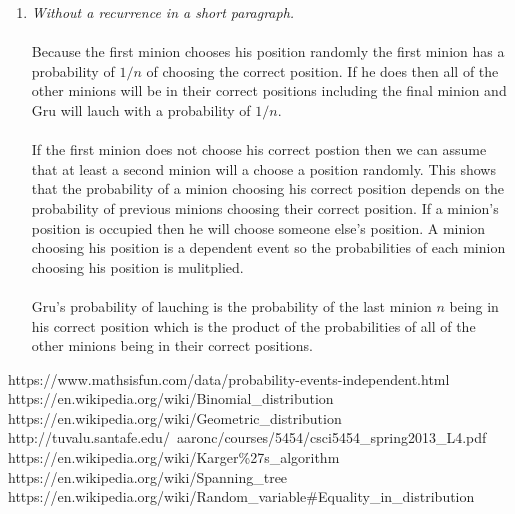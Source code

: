 \documentclass[12pt]{article}
\begin{document}
\begin{enumerate}
\begin{enumerate}
			\item \textit{Without a recurrence in a short paragraph.}\\
			\\
			Because the first minion chooses his position randomly the first minion has a probability of $1/n$ of choosing the correct position.  If he does then all of the other minions will be in their correct positions including the final minion and Gru will lauch with a probability of $1/n$.\\
			\\
			If the first minion does not choose his correct postion then we can assume that at least a second minion will a choose a position randomly.  This shows that the probability of a minion choosing his correct position depends on the probability of previous minions choosing their correct position.  If a minion's position is occupied then he will choose someone else's position.  A minion choosing his position is a dependent event so the probabilities of each minion choosing his position is mulitplied.\\
			\\
			Gru's probability of lauching is the probability of the last minion $n$ being in his correct position which is the product of the probabilities of all of the other minions being in their correct positions.
		\end{enumerate}

\end{enumerate}

\newpage
\begin{thebibliography}{10}
	 https://www.mathsisfun.com/data/probability-events-independent.html
	 https://en.wikipedia.org/wiki/Binomial\_distribution
	 https://en.wikipedia.org/wiki/Geometric\_distribution
   http://tuvalu.santafe.edu/~aaronc/courses/5454/csci5454\_spring2013\_L4.pdf
   https://en.wikipedia.org/wiki/Karger\%27s\_algorithm
   https://en.wikipedia.org/wiki/Spanning\_tree
   https://en.wikipedia.org/wiki/Random\_variable\#Equality\_in\_distribution
\end{thebibliography}
\end{document}
